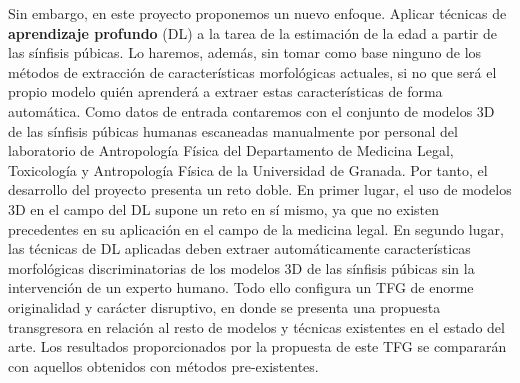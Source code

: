 Sin embargo, en este proyecto proponemos un nuevo enfoque. Aplicar técnicas de \textbf{aprendizaje profundo} (DL) a la tarea de la estimación de la edad a partir de las sínfisis púbicas. Lo haremos, además, sin tomar como base ninguno de los métodos de extracción de características morfológicas actuales, si no que será el propio modelo quién aprenderá a extraer estas características de forma automática.
Como datos de entrada contaremos con el conjunto de modelos 3D de las sínfisis púbicas humanas escaneadas manualmente por personal del laboratorio de Antropología Física del Departamento de Medicina Legal, Toxicología y Antropología Física de la Universidad de Granada. Por tanto, el desarrollo del proyecto presenta un reto doble. En primer lugar, el uso de modelos 3D en el campo del DL supone un reto en sí mismo, ya que no existen precedentes en su aplicación en el campo de la medicina legal. En segundo lugar, las técnicas de DL aplicadas deben extraer automáticamente características morfológicas discriminatorias de los modelos 3D de las sínfisis púbicas sin la intervención de un experto humano. Todo ello configura un TFG de enorme originalidad y carácter disruptivo, en donde se presenta una propuesta transgresora en relación al resto de modelos y técnicas existentes en el estado del arte. Los resultados proporcionados por la propuesta de este TFG se compararán con aquellos obtenidos con métodos pre-existentes. \\




